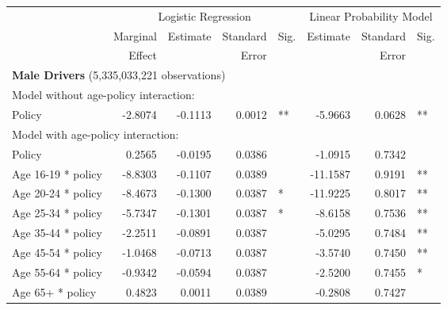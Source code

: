
\begin{table}%
\centering 
\begin{tabular}{l r r r l r r l} 

\hline 
 
 & \multicolumn{4}{c}{Logistic Regression}  & \multicolumn{3}{c}{Linear Probability Model} \\ 

 \cmidrule(lr){2-5}\cmidrule(lr){6-8} 
 & Marginal & Estimate & Standard & Sig. & Estimate & Standard & Sig. \\ 
 &   Effect &          &  Error   &      &          &  Error   &     \\ 

\hline 
 
\multicolumn{7}{l}{\textbf{Male Drivers} (5,335,033,221 observations)} \\ 

\hline
\multicolumn{7}{l}{Model without age-policy interaction: } \\ 
Policy                   &  -2.8074       &  -0.1113        &  0.0012       &   **       &  -5.9663        &  0.0628       &   **       \\ 
\hline
\multicolumn{7}{l}{Model with age-policy interaction: } \\ 
Policy                   &  0.2565       &  -0.0195        &  0.0386       &            &  -1.0915        &  0.7342       &            \\ 
Age 16-19 * policy   &  -8.8303       &  -0.1107        &  0.0389       &            &  -11.1587        &  0.9191       &   **       \\ 
Age 20-24 * policy   &  -8.4673       &  -0.1300        &  0.0387       &    *       &  -11.9225        &  0.8017       &   **       \\ 
Age 25-34 * policy   &  -5.7347       &  -0.1301        &  0.0387       &    *       &  -8.6158        &  0.7536       &   **       \\ 
Age 35-44 * policy   &  -2.2511       &  -0.0891        &  0.0387       &            &  -5.0295        &  0.7484       &   **       \\ 
Age 45-54 * policy   &  -1.0468       &  -0.0713        &  0.0387       &            &  -3.5740        &  0.7450       &   **       \\ 
Age 55-64 * policy   &  -0.9342       &  -0.0594        &  0.0387       &            &  -2.5200        &  0.7455       &    *       \\ 
Age 65+ * policy   &  0.4823       &  0.0011        &  0.0389       &            &  -0.2808        &  0.7427       &            \\ 


\end{tabular}
\end{table}
